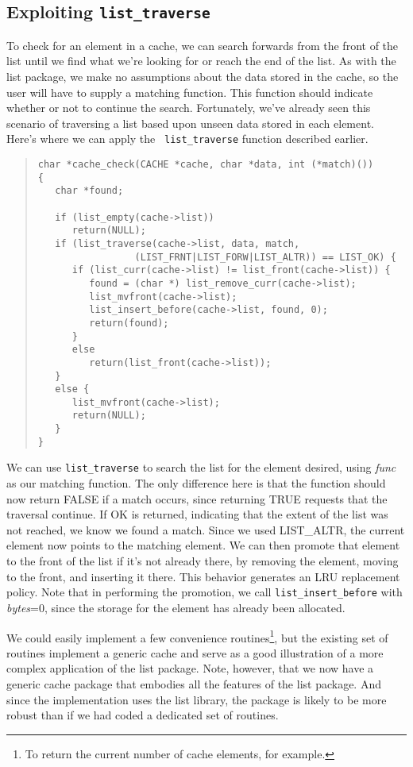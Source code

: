 \documentclass[fullpage,11pt]{article}
\begin{document}
\subsection{Exploiting {\tt list\_traverse}}
To check for an element in a cache, we can search forwards from the front of
the list until we find what we're looking for or reach the end of the list.
As with the list package, we make no assumptions about the data stored in the
cache, so the user will have to supply a matching function.  This function
should indicate whether or not to continue the search.
Fortunately, we've already seen this scenario of traversing a list based upon
unseen data stored in each element.  Here's where we can apply the {\tt
list\_traverse} function described earlier.
\begin{quote}
\begin{verbatim}
char *cache_check(CACHE *cache, char *data, int (*match)())
{
   char *found;

   if (list_empty(cache->list))
      return(NULL);
   if (list_traverse(cache->list, data, match,
	             (LIST_FRNT|LIST_FORW|LIST_ALTR)) == LIST_OK) {
      if (list_curr(cache->list) != list_front(cache->list)) {
         found = (char *) list_remove_curr(cache->list);
         list_mvfront(cache->list);
         list_insert_before(cache->list, found, 0);
         return(found);
      }
      else
         return(list_front(cache->list));
   }
   else {
      list_mvfront(cache->list);
      return(NULL);
   }
}
\end{verbatim}
\end{quote}

We can use {\tt list\_traverse} to search the list for the element desired,
using {\em func} as our matching function.  The only difference here is that
the function should now return FALSE if a match occurs, since returning TRUE
requests that the traversal continue.  If OK is returned, indicating that the
extent of the list was not reached, we know we found a match.  Since we used
LIST\_ALTR, the current element now points to the matching element.  We can
then promote that element to the front of the list if it's not already there,
by removing the element, moving to the front, and inserting it there.  This
behavior generates an LRU replacement policy.  Note that in performing the
promotion, we call {\tt list\_insert\_before} with {\em bytes}=0, since the
storage for the element has already been allocated.

We could easily implement a few convenience routines\footnote{To return the
current number of cache elements, for example.}, but the existing set of
routines implement a generic cache and serve as a good illustration of a more
complex application of the list package.  Note, however, that we now have a
generic cache package that embodies all the features of the list package.  And
since the implementation uses the list library, the package is likely to be
more robust than if we had coded a dedicated set of routines.
\end{document}
